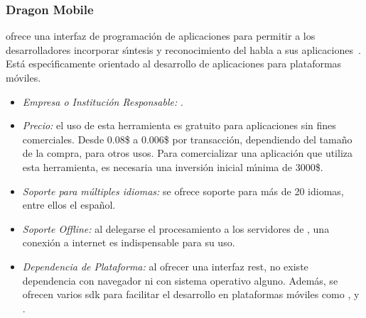 \subsubsection{Dragon Mobile}
\label{sec:dragonmobile}

 ofrece una interfaz de programaci\'on de aplicaciones para permitir
a los desarrolladores incorporar s{\'\i}ntesis y reconocimiento del habla a sus
\mbox{aplicaciones \cite{DragonMobile}}. Est\'a espec{\'\i}ficamente orientado al desarrollo de
aplicaciones para plataformas m\'oviles.

\begin{itemize}
	\item \emph{Empresa o Instituci\'on Responsable:} .
	\item \emph{Precio:} el uso de esta herramienta es gratuito para aplicaciones sin fines comerciales.
	Desde 0.08\$ a 0.006\$ por transacci\'on, dependiendo del tama\~no de la compra, para otros usos.
	Para comercializar una aplicaci\'on que utiliza esta herramienta, es necesaria una inversi\'on inicial
	m{\'\i}nima de 3000\$.
	\item \emph{Soporte para m\'ultiples idiomas:} se ofrece soporte para m\'as de 20 idiomas, entre ellos
	el espa\~nol.
	\item \emph{Soporte Offline:} al delegarse el procesamiento a los servidores de ,
	una conexi\'on a internet es indispensable para su uso.
	\item \emph{Dependencia de Plataforma:} al ofrecer una interfaz \gls{rest}, no existe dependencia con navegador
	ni con sistema operativo alguno. Adem\'as, se ofrecen varios \gls{sdk} para facilitar
	el desarrollo en plataformas m\'oviles como ,  y .
\end{itemize}